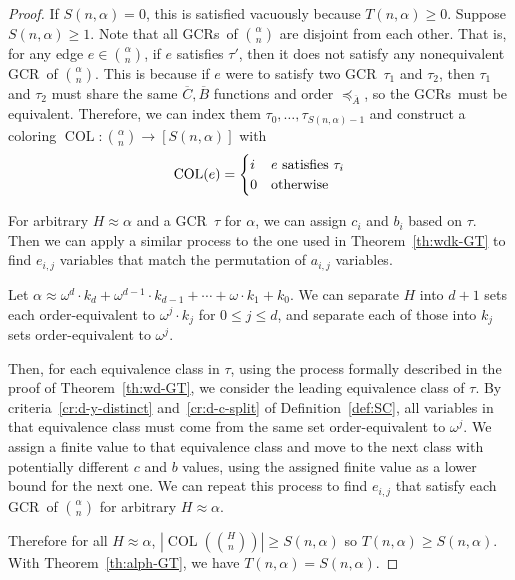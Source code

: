 \documentclass[10pt,a4paper]{article}
\newcommand{\om}{\omega}
\newcommand{\oequiv}{\approx}
\newcommand{\COL}{\operatorname{COL}}
\newcommand{\gencrulenospace}{GCR}
\newcommand{\gencrule}{\gencrulenospace~}
\newcommand{\gencrules}{\gencrulenospace s~}
\newcommand{\xleq}{\preceq_{\overline{A}}}
\newcommand{\assny}{\overline{B}}
\newcommand{\assnc}{\overline{C}}
\newcommand{\numpoints}{n}
\newcommand{\inumpoints}{i}
\newcommand{\idegr}{j}
\newcommand{\commonconst}{a}
\newcommand{\rareconst}{b}
\theoremstyle{plain}
\theoremstyle{definition}
\begin{document}
\begin{proof}
If $S(\numpoints, \alpha) = 0$, this is satisfied vacuously because $T(\numpoints, \alpha) \geq 0$. Suppose $S(\numpoints,\alpha) \geq 1$.
Note that all \gencrules of $\binom{\alpha}{\numpoints}$ are disjoint from each other. That is, for any edge $e \in \binom{\alpha}{\numpoints}$, if $e$ satisfies $\tau'$, then it does not satisfy any nonequivalent \gencrule of $\binom{\alpha}{\numpoints}$. This is because if $e$ were to satisfy two \gencrule $\tau_1$ and $\tau_2$, then $\tau_1$ and $\tau_2$ must share the same $\assnc, \assny$ functions and order $\xleq$, so the \gencrules must be equivalent. Therefore, we can index them $\tau_0, \ldots, \tau_{S(\numpoints, \alpha)-1}$ and construct a coloring $\COL \colon \binom{\alpha}{\numpoints} \to [S(\numpoints, \alpha)]$ with \begin{align*}
    \COL(e) = \begin{cases}
    i & e \textnormal{ satisfies } \tau_i\\
    0 & \textnormal{otherwise}
    \end{cases}
\end{align*}

For arbitrary $H \oequiv \alpha$ and a \gencrule $\tau$ for $\alpha$, we can assign $c_{\inumpoints}$ and $\rareconst_{\inumpoints}$ based on $\tau$. Then we can apply a similar process to the one used in Theorem~\ref{th:wdk-GT} to find $e_{\inumpoints,\idegr}$ variables that match the permutation of $\commonconst_{\inumpoints,\idegr}$ variables.

Let $\alpha \oequiv \om^d \cdot k_d + \om^{d-1} \cdot k_{d-1} + \cdots + \om \cdot k_1 + k_0$.
We can separate $H$ into $d+1$ sets each order-equivalent to $\om^{\idegr} \cdot k_{\idegr}$ for $0 \leq \idegr \leq d$, and separate each of those into $k_{\idegr}$ sets order-equivalent to $\om^{\idegr}$.

Then, for each equivalence class in $\tau$, using the process formally described in the proof of Theorem~\ref{th:wd-GT},
we consider the leading equivalence class of $\tau$. By criteria~\ref{cr:d-y-distinct} and~\ref{cr:d-c-split}
of Definition~\ref{def:SC}, all variables in that equivalence class 
must come from the same set order-equivalent to $\om^{\idegr}$. We assign a finite value to 
that equivalence class and move to the next class with potentially different 
$c$ and $\rareconst$ values, using the assigned finite value as a lower bound for the next one. We can repeat this process to find $e_{\inumpoints ,\idegr}$ that satisfy each \gencrule of $\binom{\alpha}{\numpoints}$ for arbitrary $H \oequiv \alpha$.

Therefore for all 
$H \oequiv \alpha$,
$\left|\COL\left(\binom{H}{\numpoints}\right)\right|\geq S(\numpoints,\alpha)$ so $T(\numpoints,\alpha) \geq S\left(\numpoints, \alpha\right)$.
With Theorem~\ref{th:alph-GT}, we have
$T(\numpoints,\alpha) = S\left(\numpoints, \alpha\right)$.
\end{proof}
\end{document}
